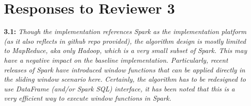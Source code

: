 \documentclass{vldb}
\newcommand{\eat}[1]{}
\begin{document}
\eat{We understand that spatiotemporal mining with 
domain-specific constraints may look similar to GCMP.
However, we are unaware of existing works on the same GCMP model
 with domain-specific constraints.

Generally, patterns defined with domain-specific constraints are hard to be generalized.
This is because constraints available in one domain (e.g., road direction in road networks)
are often not available in other domains (e.g., no road directions available for visitor movements in a shopping mall). Nevertheless,
when deploying on a specific domain, our GCMP solutions are amendable to
incorporate more domain-specific constraints (i.e., rewrite the $\mathtt{sim}$ operation in Algorithm 3). 
We summarize the discussion in Section 2.3.
}


%
%
%




\section{Responses to Reviewer 3}
\textbf{3.1:} \emph{Though the implementation references Spark as the implementation
platform (as it also reflects in github repo provided), the algorithm design is
mostly limited to MapReduce, aka only Hadoop, which is a very small subset of
Spark. This may have a negative impact on the baseline implementation.
Particularly, recent releases of Spark have introduced window functions that can
be applied directly in the sliding window scenario here. Certainly, the algorithm
has to be redesigned to use DataFrame (and/or Spark SQL) interface, it has
been noted that this is a very efficient way to execute window functions in
Spark.}
\end{document}
